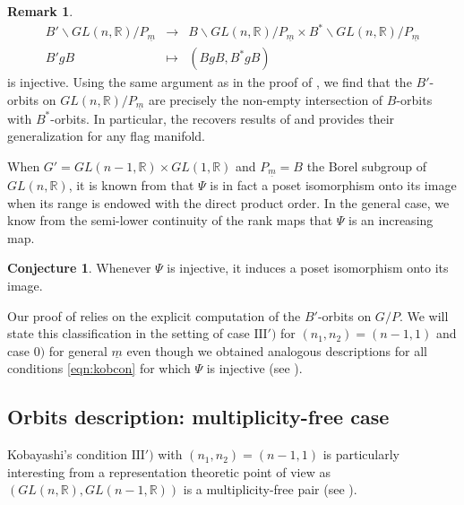 \documentclass[pdftex]{sigma}
\numberwithin{equation}{section}
\theoremstyle{definition}
\newtheorem{Remark}[Theorem]{Remark}
\newtheorem*{Conjecture*}{Conjecture}
\newcommand{\R}{\mathbb{R}}
\theoremstyle{plain}
\theoremstyle{plain}
\theoremstyle{plain}
\theoremstyle{plain}
\begin{document}
\begin{Remark}
	\begin{equation*}
		\begin{array}{ccc}
		B' \backslash GL(n,\R)/P_{\underline m} & \to & B\backslash GL(n,\R) /P_{\underline m} \times B^*\backslash GL(n,\R) /P_{\underline m} \\
		B'gB & \mapsto & (BgB,B^*gB)
	\end{array}
	\end{equation*}
	is injective. Using the same argument as in the proof of , we find that the $B'$-orbits on $GL(n,\R)/P_{\underline m}$ are precisely the non-empty intersection of $B$-orbits with $B^*$-orbits.
	In particular, the  recovers results of \cite[Corollary 2.5]{ColarussoEvens} and provides their generalization for any flag manifold.
\end{Remark}

When $G' = GL(n-1,\R) \times GL(1,\R)$ and $P_{\underline m} = B$ the Borel subgroup of $GL(n,\R)$, it is known from \cite{ColarussoEvens} that $\Psi$ is in fact a poset isomorphism onto its image when its range is endowed with the direct product order.
In the general case, we know from the semi-lower continuity of the rank maps that $\Psi$ is an increasing map.

\begin{Conjecture*}
	Whenever $\Psi$ is injective, it induces a poset isomorphism onto its image.
\end{Conjecture*}

Our proof of  relies on the explicit computation of the $B'$-orbits on $G/P$. We will state this classification in the setting of case $\mathrm{III}')$ for $(n_1,n_2) = (n-1,1)$ and case $0)$ for general $\underline m$ even though we obtained analogous descriptions for all conditions \eqref{eqn:kobcon} for which $\Psi$ is injective (see ).

\subsection{Orbits description: multiplicity-free case}

Kobayashi's condition $\mathrm{III}')$ with $(n_1,n_2) = (n-1,1)$ is particularly interesting from a representation theoretic point of view as $(GL(n,\R),GL(n-1,\R))$ is a multiplicity-free pair (see \cite{zhu}).
\end{document}
